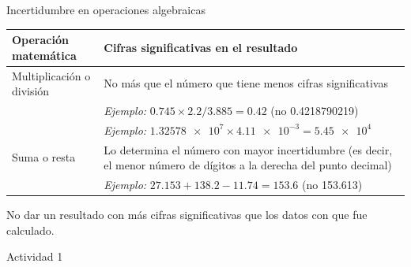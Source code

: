 \documentclass[9pt, aspectratio=169]{beamer}
\begin{document}
\begin{frame}{Incertidumbre en operaciones algebraicas}
\begin{center}
    \begin{tabular}{p{4cm}p{8cm}}
        \toprule
        \textbf{Operación matemática} & \textbf{Cifras significativas en el resultado} \\
        \midrule 
        Multiplicación o división & No más que el número que tiene menos cifras significativas \\
                                  & \textit{Ejemplo:} $\num{0.745} \times \num{2.2} / \num{3.885} = \num{0.42}$ (no \num{0.4218790219}) \\
                                  & \textit{Ejemplo:} $\num{1.32578e7} \times \num{4.11e-3} = \num{5.45e4}$ \\
        Suma o resta & Lo determina el número con mayor incertidumbre (es decir, el menor número de dígitos a la derecha del punto decimal) \\
                     & \textit{Ejemplo:} $\num{27.153} + \num{138.2} - \num{11.74} = \num{153.6}$ (no \num{153.613})\\
        \bottomrule
    \end{tabular}
\end{center}

\begin{alertblock}{\centering \faExclamationTriangle}
No dar un resultado con más cifras significativas que los datos con que fue calculado.
\end{alertblock}

\begin{center}
{\Large \faArrowCircleRight \faPen* Actividad 1}
\end{center}

\end{frame}
\end{document}
